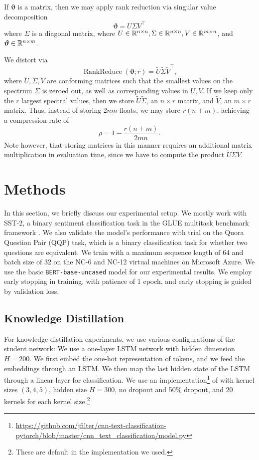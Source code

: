 \documentclass[10pt]{article}
\newcommand{\rankreduce}{\operatorname{RankReduce}}
\newcommand{\bvartheta}{{\bm{\vartheta}}}
\begin{document}
 If $\bvartheta$ is a matrix, then we may apply
rank
reduction via singular value decomposition \[
\bvartheta = U\Sigma V^\top
\]
where $\Sigma$ is a diagonal matrix, where $U \in \mathbb{R}^{n\times n}, \Sigma\in \mathbb{R}^
{n\times n}, V\in \mathbb{R}^{m\times n}$, and $\bvartheta \in \R^{n\times m}$.

We distort via \[
\rankreduce(\bvartheta; r) = \tilde U \tilde \Sigma \tilde V^\top,
\]
where $\tilde U, \tilde \Sigma, \tilde V$ are conforming matrices such that the
smallest values on the spectrum $\Sigma$ is zeroed out, as well as corresponding
values in $U,V$. If we keep only the $r$ largest spectral values, then we store
$\tilde U \tilde \Sigma$, an $n\times r$ matrix, and $\tilde V$, an $m\times r$
matrix. Thus, instead of storing $2nm$ floats, we may store $r(n+m)$, achieving
a compression rate of \[
\rho = 1-\frac{r(n+m)}{2mn}.
\]
Note however, that storing matrices in this manner requires an additional
matrix multiplication in evaluation time, since we have to compute the product
$\tilde U \tilde \Sigma \tilde V$. 

\section{Methods}
In this section, we briefly discuss our experimental setup. We mostly
work with
SST-2, a binary sentiment classification task in the GLUE multitask benchmark
framework \citep{wang2018glue}. We also validate the model's
performance with trial on the Quora Question Pair (QQP) task, which is a
binary classification task for whether two questions are equivalent. We
train with a maximum sequence length of 64 and batch size of 32 on the
NC-6 and NC-12 virtual machines on Microsoft Azure. We use the basic 
\texttt{BERT-base-uncased} model for our experimental results. We employ
early stopping in training, with patience of 1 epoch, and early stopping is
guided by validation loss. 

\subsection{Knowledge Distillation}

For knowledge distillation experiments, we use various configurations of the
student network:  We use a one-layer LSTM network with hidden
dimension $H=200$. We first embed the one-hot representation of tokens, and we
feed the embeddings through an LSTM. We then map the last hidden state of the
LSTM through a linear layer for classification.   We use an
implementation\footnote{\url{https://github.com/jfilter/cnn-text-classification-pytorch/blob/master/cnn_text_classification/model.py}}
of \citet{kim2014convolutional} with kernel sizes $(3,4,5)$, hidden size
$H=300$, no dropout and 50\% dropout, and $20$ kernels for each kernel
size.\footnote{These are default in the implementation we used.} 
\end{document}
